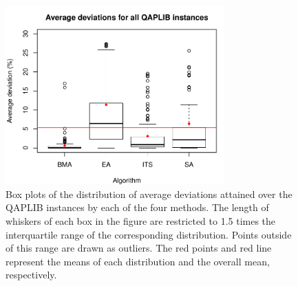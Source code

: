 \begin{figure}
    \centering
    \includegraphics[width=0.75\textwidth]{figures/results-deviations-box-plot.pdf}%
    \caption{
        Box plots of the distribution of average deviations attained over the QAPLIB instances by each of the four methods.
        The length of whiskers of each box in the figure are restricted to 1.5 times the interquartile range of the corresponding distribution. Points outside of this range are drawn as outliers.
        The red points and red line represent the means of each distribution and the overall mean, respectively.
    }
    \label{fig:results-deviations}

    \vspace{1cm}


\end{figure}
